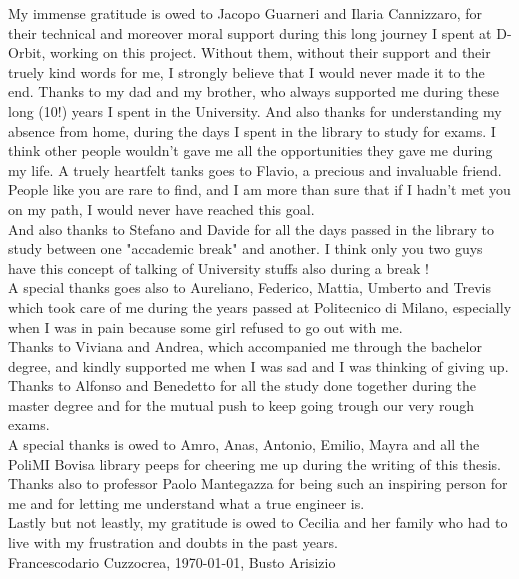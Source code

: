 My immense gratitude is owed to Jacopo Guarneri and Ilaria Cannizzaro, for their technical and moreover moral support during this long journey I spent at D-Orbit, working on this project. Without them, without their support and their truely kind words for me, I strongly believe that I would never made it to the end.
Thanks to my dad and my brother, who always supported me during these long (10!) years I spent in the University. And also thanks for understanding my absence from home, during the days I spent in the library to study for exams. I think other people wouldn't gave me all the opportunities they gave me during my life.
A truely heartfelt tanks goes to Flavio, a precious and invaluable friend. People like you are rare to find, and I am more than sure that if I hadn't met you on my path, I would never have reached this goal.\\
And also thanks to Stefano and Davide for all the days passed in the library to study between one "accademic break" and another. I think only you two guys have this concept of talking of University stuffs also during a break ! \\
A special thanks goes also to Aureliano, Federico, Mattia, Umberto and Trevis which took care of me during the years passed at Politecnico di Milano, especially when I was in pain because some girl refused to go out with me.\\
Thanks to Viviana and Andrea, which accompanied me through the bachelor degree, and kindly supported me when I was sad and I was thinking of giving up.\\
Thanks to Alfonso and Benedetto for all the study done together during the master degree and for the mutual push to keep going trough our very rough exams.\\
A special thanks is owed to Amro, Anas, Antonio, Emilio, Mayra and all the PoliMI Bovisa library peeps for cheering me up during the writing of this thesis.
Thanks also to professor Paolo Mantegazza for being such an inspiring person for me and for letting me understand what a true engineer is.\\
Lastly but not leastly, my gratitude is owed to Cecilia and her family who had to live with my frustration and doubts in the past years.\\

Francescodario Cuzzocrea, \today, Busto Arisizio
